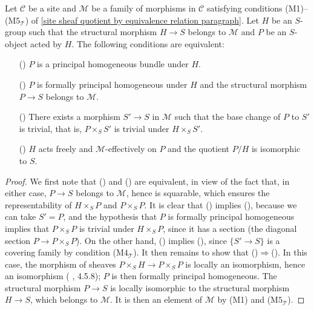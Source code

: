 \begin{proposition}\label{site formally principal homogeneous under M-group iff}
Let $\mathcal{C}$ be a site and $\mathcal{M}$ be a family of morphisms in $\mathcal{C}$ satisfying conditions (M1)--($\text{M}5_\mathcal{T}$) of \ref{site sheaf quotient by equivalence relation paragraph}. Let $H$ be an $S$-group such that the structural morphism $H\to S$ belongs to $\mathcal{M}$ and $P$ be an $S$-object acted by $H$. The following conditions are equivalent:
\begin{enumerate}
    \item[(\rmnum{1})] $P$ is a principal homogeneous bundle under $H$.
    \item[(\rmnum{2})] $P$ is formally principal homogeneous under $H$ and the structural morphism $P\to S$ belongs to $\mathcal{M}$.
    \item[(\rmnum{3})] There exists a morphism $S'\to S$ in $\mathcal{M}$ such that the base change of $P$ to $S'$ is trivial, that is, $P\times_SS'$ is trivial under $H\times_SS'$.
    \item[(\rmnum{4})] $H$ acts freely and $\mathcal{M}$-effectively on $P$ and the quotient $P/H$ is isomorphic to $S$.
\end{enumerate}
\end{proposition}
\begin{proof}
We first note that () and () are equivalent, in view of the fact that, in either case, $P\to S$ belongs to $\mathcal{M}$, hence is squarable, which ensures the representability of $H\times_SP$ and $P\times_SP$. It is clear that () implies (), because we can take $S'=P$, and the hypothesis that $P$ is formally principal homogeneous implies that $P\times_SP$ is trivial under $H\times_SP$, since it has a section (the diagonal section $P\to P\times_SP$). On the other hand, () implies (), since $\{S'\to S\}$ is a covering family by condition ($\text{M4}_\mathcal{T}$). It then remains to show that ()$\Rightarrow$(). In this case, the morphism of sheaves $P\times_SH\to P\times_SP$ is locally an isomorphism, hence an isomorphism (\cite{SGA3-1} , 4.5.8); $P$ is then formally principal homogeneous. The structural morphism $P\to S$ is locally isomorphic to the structural morphism $H\to S$, which belongs to $\mathcal{M}$. It is then an element of $\mathcal{M}$ by (M1) and ($\text{M5}_\mathcal{T}$).
\end{proof}

